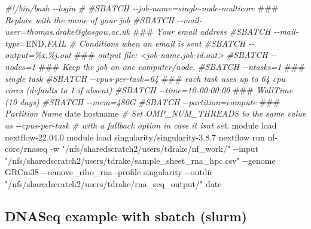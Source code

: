 \documentclass[
]{book}
\newenvironment{Shaded}{\begin{snugshade}}{\end{snugshade}}
\newcommand{\AlertTok}[1]{\textcolor[rgb]{0.94,0.16,0.16}{#1}}
\newcommand{\AttributeTok}[1]{\textcolor[rgb]{0.77,0.63,0.00}{#1}}
\newcommand{\CommentTok}[1]{\textcolor[rgb]{0.56,0.35,0.01}{\textit{#1}}}
\newcommand{\ExtensionTok}[1]{#1}
\newcommand{\FunctionTok}[1]{\textcolor[rgb]{0.00,0.00,0.00}{#1}}
\newcommand{\NormalTok}[1]{#1}
\newcommand{\RegionMarkerTok}[1]{#1}
\newcommand{\StringTok}[1]{\textcolor[rgb]{0.31,0.60,0.02}{#1}}
\begin{document}
\begin{Shaded}
\begin{Highlighting}[]
\CommentTok{\#!/bin/bash {-}{-}login}
\CommentTok{\#}
\CommentTok{\#SBATCH {-}{-}job{-}name=single{-}node{-}multicore }\AlertTok{\#\#\#}\CommentTok{ Replace with the name of your job}
\CommentTok{\#SBATCH {-}{-}mail{-}user=thomas.drake@glasgow.ac.uk }\AlertTok{\#\#\#}\CommentTok{ Your email address}
\CommentTok{\#SBATCH {-}{-}mail{-}type=}\RegionMarkerTok{END}\CommentTok{,FAIL \# Conditions when an email is sent}
\CommentTok{\#SBATCH {-}{-}output=\%x.\%j.out }\AlertTok{\#\#\#}\CommentTok{ output file: \textless{}job{-}name.job{-}id.out\textgreater{}}
\CommentTok{\#SBATCH {-}{-}nodes=1 }\AlertTok{\#\#\#}\CommentTok{ Keep the job on one computer/node.}
\CommentTok{\#SBATCH {-}{-}ntasks=1 }\AlertTok{\#\#\#}\CommentTok{ single task}
\CommentTok{\#SBATCH {-}{-}cpus{-}per{-}task=64  }\AlertTok{\#\#\#}\CommentTok{ each task uses up to 64 cpu cores (defaults to 1 if absent)}
\CommentTok{\#SBATCH {-}{-}time=10{-}00:00:00 }\AlertTok{\#\#\#}\CommentTok{ WallTime (10 days)}
\CommentTok{\#SBATCH {-}{-}mem=480G}
\CommentTok{\#SBATCH {-}{-}partition=compute }\AlertTok{\#\#\#}\CommentTok{ Partition Name}
\FunctionTok{date}
\FunctionTok{hostname}
\CommentTok{\# Set OMP\_NUM\_THREADS to the same value as {-}{-}cpus{-}per{-}task}
\CommentTok{\# with a fallback option in case it isn\textquotesingle{}t set.}
\ExtensionTok{module}\NormalTok{ load nextflow{-}22.04.0}
\ExtensionTok{module}\NormalTok{ load singularity/singularity{-}3.8.7}
\ExtensionTok{nextflow}\NormalTok{ run nf{-}core/rnaseq }\AttributeTok{{-}w} \StringTok{"/nfs/sharedscratch2/users/tdrake/nf\_work/"} \AttributeTok{{-}{-}input} \StringTok{"/nfs/sharedscratch2/users/tdrake/sample\_sheet\_rna\_hpc.csv"} \AttributeTok{{-}{-}genome}\NormalTok{ GRCm38 }\AttributeTok{{-}{-}remove\_ribo\_rna} \AttributeTok{{-}profile}\NormalTok{ singularity }\AttributeTok{{-}{-}outdir} \StringTok{"/nfs/sharedscratch2/users/tdrake/rna\_seq\_output/"}
\FunctionTok{date}
\end{Highlighting}
\end{Shaded}

\hypertarget{dnaseq-example-with-sbatch-slurm}{%
\subsection{DNASeq example with sbatch (slurm)}\label{dnaseq-example-with-sbatch-slurm}}
\end{document}
